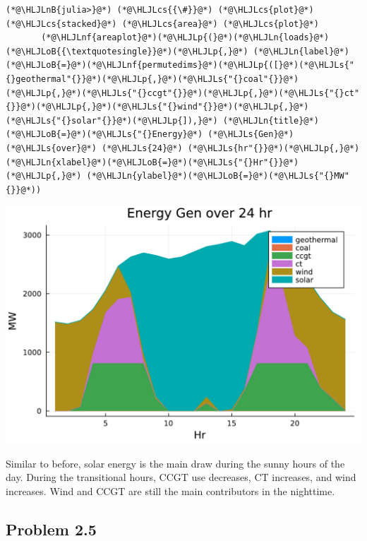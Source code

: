 \documentclass[12pt,a4paper]{article}
\newcommand{\HLJLn}[1]{#1}
\newcommand{\HLJLnf}[1]{\textcolor[RGB]{66,102,213}{#1}}
\newcommand{\HLJLs}[1]{\textcolor[RGB]{201,61,57}{#1}}
\newcommand{\HLJLnB}[1]{\textcolor[RGB]{59,151,46}{#1}}
\newcommand{\HLJLoB}[1]{\textcolor[RGB]{102,102,102}{\textbf{#1}}}
\newcommand{\HLJLp}[1]{#1}
\newcommand{\HLJLcs}[1]{\textcolor[RGB]{153,153,119}{\textit{#1}}}
\begin{document}
\begin{lstlisting}
(*@\HLJLnB{julia>}@*) (*@\HLJLcs{{\#}}@*) (*@\HLJLcs{plot}@*) (*@\HLJLcs{stacked}@*) (*@\HLJLcs{area}@*) (*@\HLJLcs{plot}@*)
       (*@\HLJLnf{areaplot}@*)(*@\HLJLp{(}@*)(*@\HLJLn{loads}@*)(*@\HLJLoB{{\textquotesingle}}@*)(*@\HLJLp{,}@*) (*@\HLJLn{label}@*)(*@\HLJLoB{=}@*)(*@\HLJLnf{permutedims}@*)(*@\HLJLp{([}@*)(*@\HLJLs{"{}geothermal"{}}@*)(*@\HLJLp{,}@*)(*@\HLJLs{"{}coal"{}}@*)(*@\HLJLp{,}@*)(*@\HLJLs{"{}ccgt"{}}@*)(*@\HLJLp{,}@*)(*@\HLJLs{"{}ct"{}}@*)(*@\HLJLp{,}@*)(*@\HLJLs{"{}wind"{}}@*)(*@\HLJLp{,}@*)(*@\HLJLs{"{}solar"{}}@*)(*@\HLJLp{]),}@*) (*@\HLJLn{title}@*)(*@\HLJLoB{=}@*)(*@\HLJLs{"{}Energy}@*) (*@\HLJLs{Gen}@*) (*@\HLJLs{over}@*) (*@\HLJLs{24}@*) (*@\HLJLs{hr"{}}@*)(*@\HLJLp{,}@*) (*@\HLJLn{xlabel}@*)(*@\HLJLoB{=}@*)(*@\HLJLs{"{}Hr"{}}@*)(*@\HLJLp{,}@*) (*@\HLJLn{ylabel}@*)(*@\HLJLoB{=}@*)(*@\HLJLs{"{}MW"{}}@*))
\end{lstlisting}
\includegraphics[width=\linewidth]{figures/solution-template_10_2.pdf}

Similar to before, solar energy is the main draw during the sunny hours of the day. During  the transitional hours, CCGT use decreases, CT increases, and wind increases.  Wind and CCGT are still the main contributors in the nighttime.

\subsection{Problem 2.5}
\end{document}
